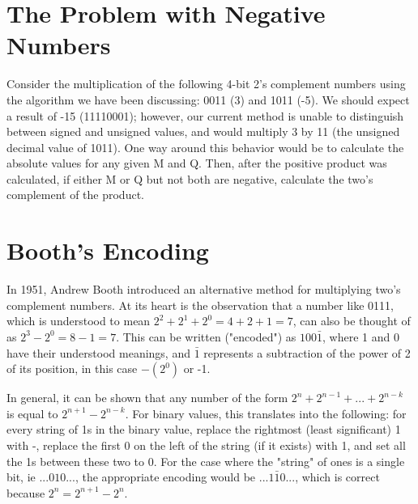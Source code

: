 \documentclass{article}
\begin{document}

\section{The Problem with Negative Numbers}
Consider the multiplication of the following 4-bit 2's complement numbers using the algorithm we have been discussing: 0011 (3) and 1011 (-5).
We should expect a result of -15 (11110001); however, our current method is unable to distinguish between signed and unsigned values, and would multiply 3 by 11 (the unsigned decimal value of 1011).
One way around this behavior would be to calculate the absolute values for any given M and Q.
Then, after the positive product was calculated, if either M or Q but not both are negative, calculate the two's complement of the product.

\section{Booth's Encoding}
In 1951, Andrew Booth introduced an alternative method for multiplying two's complement numbers.
At its heart is the observation that a number like 0111, which is understood to mean $2^2 + 2^1 + 2^0 = 4 + 2 + 1 = 7$, can also be thought of as $2^3 - 2^0 = 8 - 1 = 7$.
This can be written ("encoded") as $100\bar{1}$, where 1 and 0 have their understood meanings, and $\bar{1}$ represents a subtraction of the power of 2 of its position, in this case $-(2^0)$ or -1.

    In general, it can be shown that any number of the form $2^n + 2^{n-1} + ...
+ 2^{n-k}$ is equal to $2^{n+1} - 2^{n-k}$.
For binary values, this translates into the following: for every string of 1s in the binary value, replace the rightmost (least significant) 1 with -, replace the first 0 on the left of the string (if it exists) with 1, and set all the 1s between these two to 0.
For the case where the "string" of ones is a single bit, ie $...010...$,
the appropriate encoding would be $...1\bar{1}0...$,
which is correct because $2^n = 2^{n+1} - 2^n$.
\end{document}
